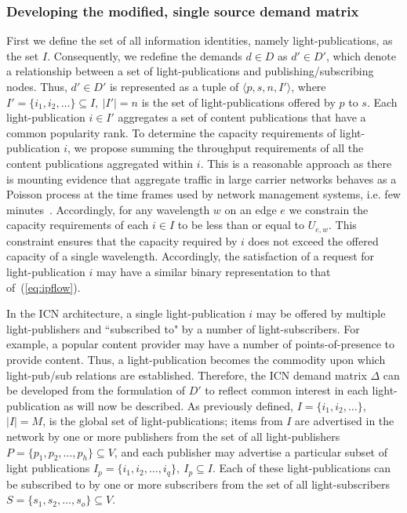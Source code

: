 \documentclass[journal]{IEEEtran}
\begin{document}
\subsubsection{Developing the modified, single source demand matrix}
First we define the set of all information identities,
namely light-publications, as the set $I$. Consequently, we redefine the demands $d\in D$ as
$d'\in D'$, which denote a relationship between a set of
light-publications and publishing/subscribing nodes. Thus, $d'\in D'$
is represented as a tuple of $\langle p, s, n, I'\rangle$, where $I' =\{i_1, i_2,
\ldots\} \subseteq I, \ |I'|=n$ is the set of light-publications offered
by $p$ to $s$. 
Each light-publication $i \in I'$ aggregates a set of content publications that have a common popularity rank. To determine the capacity requirements of light-publication $i$, we propose summing the throughput requirements of all the content publications aggregated within $i$. This is a reasonable approach as there is mounting evidence that aggregate traffic in large carrier networks behaves as a Poisson process at the time frames used by network management systems, i.e. few minutes~\cite{kar:te,nuc:tm}. Accordingly, for any wavelength $w$ on an edge $e$ we constrain the capacity requirements of each $i \in I$ to be less than or equal to $U_{e,w}$.
This constraint ensures that the capacity required by $i$ does not exceed the offered capacity of a single wavelength. Accordingly, the satisfaction of a request for light-publication $i$ may have a similar binary representation to that of~(\ref{eq:ipflow}).

In the ICN architecture, a single light-publication $i$ may be offered
by multiple light-publishers and ``subscribed to" by a number of
light-subscribers. For example, a popular content provider may have a
number of points-of-presence to provide content. Thus, a light-publication becomes the
commodity upon which light-pub/sub relations are
established. Therefore, the ICN demand matrix $\Delta$ can
be developed from the formulation of $D'$ to reflect common interest
in each light-publication as will now be described.
As previously defined, $I = \{i_1, i_2, \ldots\}$, $|I|=M$, is the global
set of light-publications; items from $I$ are advertised in the
network by one or more publishers from the set of all light-publishers $P =
\{p_1, p_2, \dots, p_h\} \subseteq V$, and each publisher may advertise
a particular subset of light publications $ I_p = \{i_1, i_2,\dots, i_q\}, \ I_p \subseteq I \label{ipub} $. Each of these light-publications can be
subscribed to by one or more subscribers from the set of all
light-subscribers $S = \{s_1, s_2,\dots, s_o\} \subseteq V$.
\end{document}
